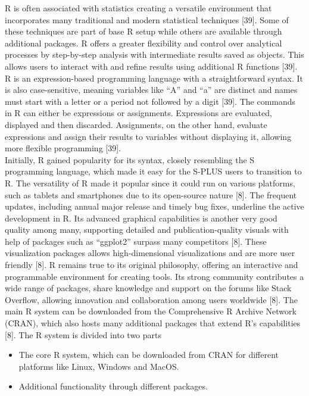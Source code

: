 \documentclass[12pt,a4paper]{report}
\begin{document}
R is often associated with statistics creating a versatile environment that incorporates many traditional and modern statistical techniques [39]. Some of these techniques are part of base R setup while others are available through additional packages. R offers a greater flexibility and control over analytical 
processes by step-by-step analysis with intermediate results saved as objects. This allows users to interact with and refine results using additional R functions [39].
R is an expression-based programming language with a straightforward syntax. It is also case-sensitive, meaning variables like “A” and “a” are distinct and names must start with a letter or a period not followed by a digit [39]. The commands in R can either be expressions or assignments. 
Expressions are evaluated, displayed and then discarded. Assignments, on the other hand, evaluate expressions and assign their results to variables without displaying it, allowing more flexible programming [39]. \\

Initially, R gained popularity for its syntax, closely resembling the S programming language, which made it easy for the S-PLUS users to transition to R. The versatility of R made it popular since it could run on various platforms, such as tablets and smartphones due to its open-source nature [8]. 
The frequent updates, including annual major release and timely bug fixes, underline the active development in R. Its advanced graphical capabilities is another very good quality among many, supporting detailed and publication-quality visuals with help of packages such as “ggplot2” surpass many competitors [8].
These visualization packages allows high-dimensional visualizations and are more user friendly [8]. R remains true to its original philosophy, offering an interactive and programmable environment for creating tools. Its strong community contributes a wide range of packages, share knowledge and support on the 
forums like Stack Overflow, allowing innovation and collaboration among users worldwide [8]. The main R system can be downloaded from the Comprehensive R Archive Network (CRAN), which also hosts many additional packages that extend R’s capabilities [8]. The R system is divided into two parts \\

\begin{itemize}
    \item The core R system, which can be downloaded from CRAN for different platforms like Linux, Windows and MacOS.
    \item Additional functionality through different packages.
\end{itemize}
\end{document}
